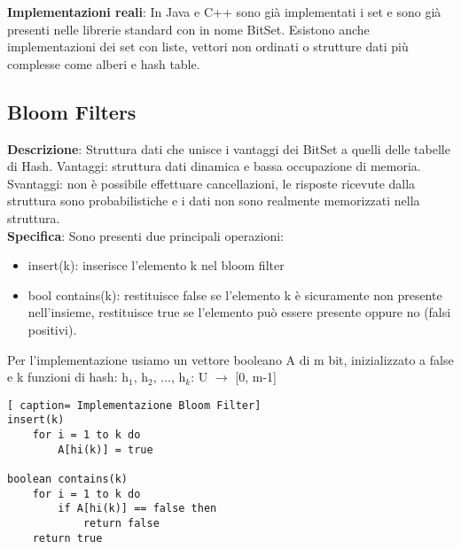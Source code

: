 \documentclass[../cheatSheetAlgoritmi.tex]{subfiles}
\begin{document}
\textbf{Implementazioni reali}: In Java e C++ sono già implementati i set e sono già presenti nelle librerie standard con in nome BitSet. Esistono anche implementazioni dei set con liste, vettori non ordinati o strutture dati più complesse come alberi e hash table.

\subsection{Bloom Filters}
\textbf{Descrizione}: Struttura dati che unisce i vantaggi dei BitSet a quelli delle tabelle di Hash. Vantaggi: struttura dati dinamica e bassa occupazione di memoria. Svantaggi: non è possibile effettuare cancellazioni, le risposte ricevute dalla struttura sono probabilistiche e i dati non sono realmente memorizzati nella struttura.\\
\textbf{Specifica}: Sono presenti due principali operazioni:
\begin{itemize}
 	\item insert(k): inserisce l'elemento k nel bloom filter 
 	\item bool contains(k): restituisce false se l'elemento k è sicuramente  non presente nell'insieme, restituisce true se l'elemento può essere presente oppure no (falsi positivi). 
\end{itemize}
Per l'implementazione usiamo un vettore booleano A di m bit, inizializzato a false e k funzioni di hash: h$_{1}$, h$_{2}$, ..., h$_{k}$: U $\rightarrow$ [0, m-1]\
\begin{lstlisting}[ caption= Implementazione Bloom Filter]
insert(k)
	for i = 1 to k do
		A[hi(k)] = true
		
boolean contains(k)
	for i = 1 to k do
		if A[hi(k)] == false then 
			return false
	return true
\end{lstlisting}
\end{document}
